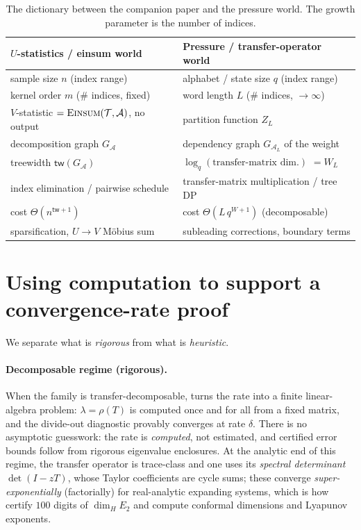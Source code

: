 \documentclass[11pt]{article}
\newcommand{\Einsum}{\textsc{Einsum}}
\newcommand{\calA}{\mathcal{A}}
\newcommand{\calT}{\mathcal{T}}
\newcommand{\tw}{\mathsf{tw}}
\newcommand{\treewidthp}[1]{\tw(#1)}
\newcommand{\graphform}[1]{G_{#1}}
\theoremstyle{plain}
\theoremstyle{definition}
\theoremstyle{remark}
\begin{document}
\begin{table}[t]
\centering
\renewcommand{\arraystretch}{1.25}
\begin{tabular}{@{}p{} p{}@{}}
\toprule
\textbf{$U$-statistics / einsum world} & \textbf{Pressure / transfer-operator world}\\
\midrule
sample size $n$ (index range) & alphabet / state size $q$ (index range)\\
kernel order $m$ (\# indices, fixed) & word length $L$ (\# indices, $\to\infty$)\\
$V$-statistic $=\Einsum(\calT,\calA)$, no output & partition function $Z_L$\\
decomposition graph $\graphform{\calA}$ & dependency graph $\graphform{\calA_L}$ of the weight\\
treewidth $\treewidthp{\graphform{\calA}}$ & $\log_q(\text{transfer-matrix dim.})$ $=W_L$\\
index elimination / pairwise schedule & transfer-matrix multiplication / tree DP\\
cost $\Theta(n^{\tw+1})$ & cost $\Theta(L\,q^{W+1})$ (decomposable)\\
sparsification, $U\!\to\!V$ Möbius sum & subleading corrections, boundary terms\\
\bottomrule
\end{tabular}
\caption{The dictionary between the companion paper and the pressure world. The
growth parameter is the number of indices.}
\label{tab:dictionary}
\end{table}

\section{Using computation to support a convergence-rate proof}
\label{sec:methodology}

We separate what is \emph{rigorous} from what is \emph{heuristic}.

\paragraph{Decomposable regime (rigorous).}
When the family is transfer-decomposable,  turns the rate into
a finite linear-algebra problem: $\lambda=\rho(T)$ is computed once and for all
from a fixed matrix, and the divide-out diagnostic provably converges at rate
$\delta$. There is no asymptotic guesswork: the rate is \emph{computed}, not
estimated, and certified error bounds follow from rigorous eigenvalue enclosures.
At the analytic end of this regime, the transfer operator is trace-class and one
uses its \emph{spectral determinant} $\det(I-zT)$, whose Taylor coefficients are
cycle sums; these converge \emph{super-exponentially} (factorially) for real-analytic
expanding systems, which is how \citet{jenkinson2018hundred} certify $100$ digits of
$\dim_H E_2$ and \citet{mcmullen1998hausdorff,pollicott2010maximal} compute conformal
dimensions and Lyapunov exponents.
\end{document}
